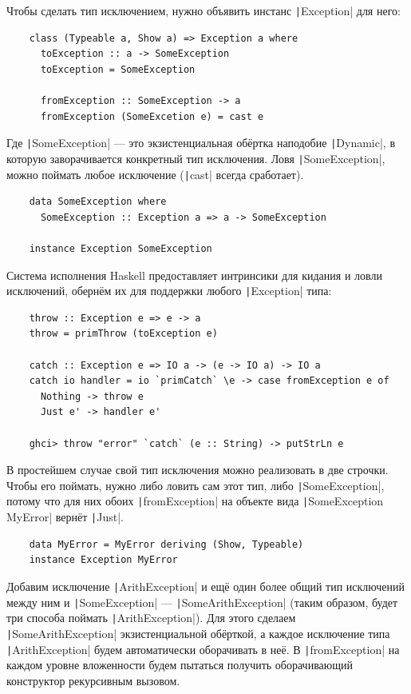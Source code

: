 Чтобы сделать тип исключением, нужно объявить инстанс \texttt|Exception| для него:
\begin{verbatim}
    class (Typeable a, Show a) => Exception a where
      toException :: a -> SomeException
      toException = SomeException

      fromException :: SomeException -> a
      fromException (SomeExcetion e) = cast e
\end{verbatim}
Где \texttt|SomeException| --- это экзистенциальная обёртка наподобие \texttt|Dynamic|, в которую заворачивается конкретный тип исключения.
Ловя \texttt|SomeException|, можно поймать любое исключение (\texttt|cast| всегда сработает).
\begin{verbatim}
    data SomeException where
      SomeException :: Exception a => a -> SomeException

    instance Exception SomeException
\end{verbatim}

Система исполнения Haskell предоставляет интринсики для кидания и ловли исключений, обернём их для поддержки любого \texttt|Exception| типа:
\begin{verbatim}
    throw :: Exception e => e -> a
    throw = primThrow (toException e)

    catch :: Exception e => IO a -> (e -> IO a) -> IO a
    catch io handler = io `primCatch` \e -> case fromException e of
      Nothing -> throw e
      Just e' -> handler e'

    ghci> throw "error" `catch` (e :: String) -> putStrLn e
\end{verbatim}

В простейшем случае свой тип исключения можно реализовать в две строчки.
Чтобы его поймать, нужно либо ловить сам этот тип, либо \texttt|SomeException|, потому что для них обоих \texttt|fromException| на объекте вида \texttt|SomeException MyError| вернёт \texttt|Just|.
\begin{verbatim}
    data MyError = MyError deriving (Show, Typeable)
    instance Exception MyError
\end{verbatim}

Добавим исключение \texttt|ArithException| и ещё один более общий тип исключений между ним и \texttt|SomeException| --- \texttt|SomeArithException| (таким образом, будет три способа поймать \texttt|ArithException|).
Для этого сделаем \texttt|SomeArithException| экзистенциальной обёрткой, а каждое исключение типа \texttt|ArithException| будем автоматически оборачивать в неё.
В \texttt|fromException| на каждом уровне вложенности будем пытаться получить оборачивающий конструктор рекурсивным вызовом.

